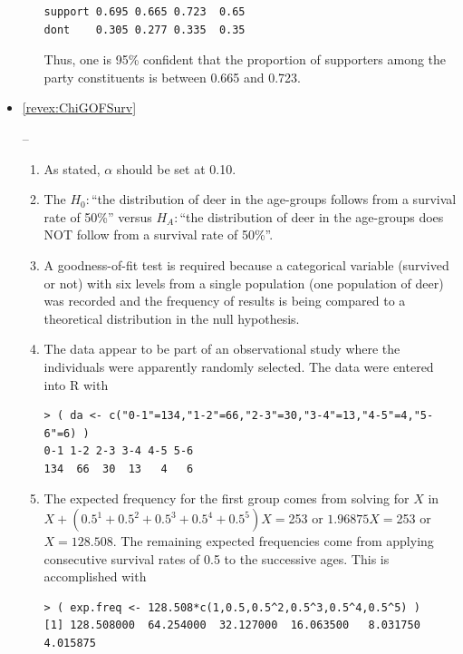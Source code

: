 \documentclass[10pt,openany]{book}\usepackage[]{graphicx}\usepackage[]{color}
\makeatletter
\newenvironment{kframe}{%
 \def\at@end@of@kframe{}%
 \ifinner\ifhmode%
  \def\at@end@of@kframe{\end{minipage}}%
  \begin{minipage}{\columnwidth}%
 \fi\fi%
 \def\FrameCommand##1{\hskip\@totalleftmargin \hskip-\fboxsep
 \colorbox{shadecolor}{##1}\hskip-\fboxsep
     \hskip-\linewidth \hskip-\@totalleftmargin \hskip\columnwidth}%
 \MakeFramed {\advance\hsize-\width
   \@totalleftmargin\z@ \linewidth\hsize
   \@setminipage}}%
 {\par\unskip\endMakeFramed%
 \at@end@of@kframe}
\newenvironment{knitrout}{}{} %
\makeatother
\begin{document}
\begin{itemize}
\begin{enumerate}
\begin{knitrout}
\begin{kframe}
\begin{verbatim}
support 0.695 0.665 0.723  0.65
dont    0.305 0.277 0.335  0.35
\end{verbatim}
\end{kframe}
\end{knitrout}
Thus, one is 95\% confident that the proportion of supporters among the party constituents is between 0.665 and 0.723.
    \end{enumerate}
  \item \hypertarget{ans:ChiGOFSurv}{\ref{revex:ChiGOFSurv}} --
    \begin{enumerate}
      \item As stated, $\alpha$ should be set at 0.10.
      \item The $H_{0}:$``the distribution of deer in the age-groups follows from a survival rate of 50\%'' versus $H_{A}:$``the distribution of deer in the age-groups does NOT follow from a survival rate of 50\%''.
      \item A goodness-of-fit test is required because a categorical variable (survived or not) with six levels from a single population (one population of deer) was recorded and the frequency of results is being compared to a theoretical distribution in the null hypothesis.
      \item The data appear to be part of an observational study where the individuals were apparently randomly selected.  The data were entered into R with
\begin{knitrout}
\color{fgcolor}\begin{kframe}
\begin{verbatim}
> ( da <- c("0-1"=134,"1-2"=66,"2-3"=30,"3-4"=13,"4-5"=4,"5-6"=6) )
0-1 1-2 2-3 3-4 4-5 5-6 
134  66  30  13   4   6 
\end{verbatim}
\end{kframe}
\end{knitrout}
      \item The expected frequency for the first group comes from solving for $X$ in $X+(0.5^{1}+0.5^{2}+0.5^{3}+0.5^{4}+0.5^{5})X =$253 or $1.96875X=$253 or $X=128.508$.  The remaining expected frequencies come from applying consecutive survival rates of 0.5 to the successive ages.  This is accomplished with
\begin{knitrout}
\color{fgcolor}\begin{kframe}
\begin{verbatim}
> ( exp.freq <- 128.508*c(1,0.5,0.5^2,0.5^3,0.5^4,0.5^5) )
[1] 128.508000  64.254000  32.127000  16.063500   8.031750   4.015875

\end{verbatim}
\end{kframe}
\end{knitrout}
\end{enumerate}
\end{itemize}
\end{document}
